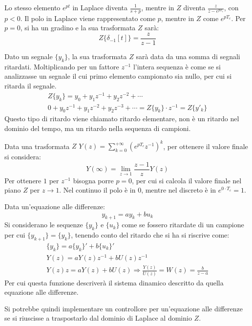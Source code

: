 \documentclass{article}
\numberwithin{equation}{subsection}
\begin{document}
Lo stesso elemento $e^{pt}$ in Laplace diventa $\displaystyle\frac{1}{s+p}$, mentre in $Z$ diventa $\displaystyle\frac{z}{z-e^{pT_c}}$, con $p<0$. Il polo in Laplace 
viene rappresentato come $p$, mentre in $Z$ come $e^{pT_c}$. Per $p=0$, si ha un gradino e la sua trasformata $Z$ sarà:
\begin{equation}
    Z\{\delta_{-1}[t]\}=\displaystyle\frac{z}{z-1}
\end{equation}


Dato un segnale $\{y_k\}$, la sua trasformata $Z$ sarà data da una somma di segnali ritardati. Moltiplicando per un fattore $z^{-1}$ l'intera sequenza è come se si analizzasse 
un segnale il cui primo elemento campionato sia nullo, per cui si ritarda il segnale. 
\begin{gather}
    Z\{y_k\}=y_0+y_1z^{-1}+y_2z^{-2}+\cdots\\
    0+y_0z^{-1}+y_1z^{-2}+y_2z^{-3}+\cdots=Z\{y_k\}\cdot z^{-1}=Z\{y'_k\}
\end{gather}
Questo tipo di ritardo viene chiamato ritardo elementare, non è un ritardo nel dominio del tempo, ma un ritardo nella sequenza di campioni. 


Data una trasformata $Z$ $Y(z)=\displaystyle\sum_{k=0}^{+\infty}(e^{pT_c}z^{-1})^k$, per ottenere il valore finale si considera:
\begin{equation}
    Y(\infty)=\lim_{z\to1}\displaystyle\frac{z-1}{z}Y(z)
\end{equation}
Per ottenere $1$ per $z^{-1}$ bisogna porre $p=0$, per cui si calcola il valore finale nel piano $Z$ per $z\to1$. Nel continuo il polo è in $0$, mentre nel discreto è in 
$e^{0\cdot T_c}=1$.  


Data un'equazione alle differenze: 
\begin{equation}
    y_{k+1}=ay_k+bu_k
\end{equation}
Si considerano le sequenze $\{y_k\}$ e $\{u_k\}$ come se fossero ritardate di un campione per cui $\{y_{k+1}\}=\{y_k\}$, tenendo conto del ritardo che si ha si riscrive come:
\begin{gather}
    \{y_k\}=a\{y_k\}'+b\{u_k\}'\\
    Y(z)=aY(z)z^{-1}+bU(z)z^{-1}\\
    Y(z)z=aY(z)+bU(z)\Rightarrow \displaystyle\frac{Y(z)}{U(z)}=W(z)=\displaystyle\frac{b}{z-a}
\end{gather}
Per cui questa funzione descriverà il sistema dinamico descritto da quella equazione alle differenze. 

Si potrebbe quindi implementare un controllore per un'equazione alle differenze se si riuscisse a traspostarlo dal dominio di Laplace al dominio $Z$. 
\end{document}
